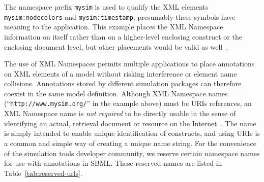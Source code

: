 \documentclass[10pt]{cekarticle}
\newcommand{\vref}[1]{\ref{#1}}
\newcommand{\changed}[1]{\textcolor{BrickRed}{#1}}
\begin{document}
The namespace prefix \texttt{mysim} is used to qualify the XML elements
\texttt{mysim:nodecolors} and \texttt{mysim:timestamp}; presumably these
symbols have meaning to the application.  This example places the XML
Namespace information on \changed{} itself rather than
on a higher-level enclosing construct or the enclosing document level, but
other placements would be valid as well~\citep{bray:1999}.

The use of XML Namespaces permits multiple applications to place
annotations on XML elements of a model without risking interference or
element name collisions.  Annotations stored by different simulation
packages can therefore coexist in the same model definition.  Although XML
Namespace names (``\texttt{http://www.mysim.org/}'' in the example above)
must be URIs references, an XML Namespace name is \emph{not required} to be
directly usable in the sense of identifying an actual, retrieval document
or resource on the Internet~\citep{bray:1999}.  The name is simply intended
to enable unique identification of constructs, and using URIs is a common
and simple way of creating a unique name string.  For the convenience of
the simulation tools developer community, we reserve certain namespace
names for use with annotations in SBML.  These reserved names are listed in
Table~\vref{tab:reserved-urls}.
\end{document}
